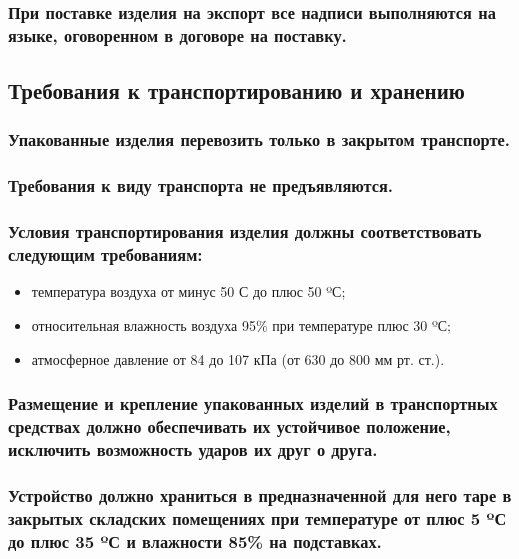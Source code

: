 \documentclass[a4paper]{bsuir-tor}
\begin{document}
\subsubsection{При поставке изделия на экспорт все надписи
  выполняются на языке, оговоренном в договоре на поставку.}

\subsection{Требования к транспортированию и хранению}

\subsubsection{Упакованные изделия перевозить только в закрытом транспорте.}

\subsubsection{ Требования к виду транспорта не предъявляются.}

\subsubsection{Условия транспортирования изделия должны
  соответствовать следующим требованиям: }
\begin{itemize}
\item температура воздуха от минус 50 С до плюс 50 ºС;
\item относительная влажность воздуха 95\% при температуре плюс 30 ºС;
\item атмосферное давление от 84 до 107 кПа (от 630 до 800 мм рт. ст.).  
\end{itemize}


\subsubsection{Размещение и крепление упакованных изделий в
транспортных средствах должно обеспечивать их устойчивое положение,
исключить возможность ударов их друг о друга.}


\subsubsection{Устройство должно храниться в предназначенной для него таре
  в закрытых складских помещениях
  при температуре от плюс 5 ºС до плюс 35 ºС и влажности
  85\% на подставках.}
\end{document}
